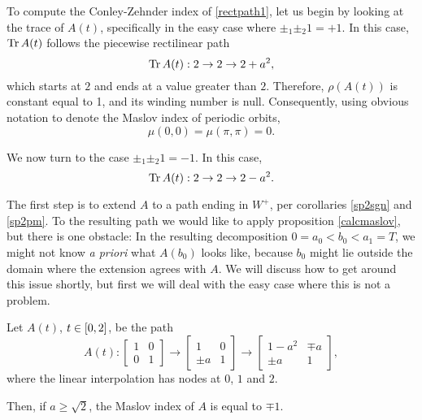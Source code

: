 To compute the Conley-Zehnder index of \eqref{rectpath1}, let us begin by looking at the trace of $A(t)$, specifically in the easy case where $\pm_1 \pm_2 1 = +1$. In this case, $\operatorname{Tr} A(t)$ follows the piecewise rectilinear path
\begin{equation}
\operatorname{Tr} A(t) : 2 \to 2 \to 2 + a^2,
\end{equation}
which starts at $2$ and ends at a value greater than $2$. Therefore, $\rho(A(t))$ is constant equal to 1, and its winding number is null. Consequently, using obvious notation to denote the Maslov index of periodic orbits,
\begin{equation}
\mu(0,0) = \mu(\pi,\pi) = 0.
\end{equation}

We now turn to the case $\pm_1 \pm_2 1 = -1$. In this case,
\begin{equation}
\operatorname{Tr} A(t) : 2 \to 2 \to 2 - a^2.
\end{equation}

The first step is to extend $A$ to a path ending in $W^+$, per corollaries \ref{sp2sgn} and \ref{sp2pm}. To the resulting path we would like to apply proposition \ref{calcmaslov}, but there is one obstacle: In the resulting decomposition $0 = a_0 < b_0 < a_1 = T$, we might not know \textit{a priori} what $A(b_0)$ looks like, because $b_0$ might lie outside the domain where the extension agrees with $A$. We will discuss how to get around this issue shortly, but first we will deal with the easy case where this is not a problem.

\begin{prop}\label{easymaslov}
Let $A(t)$, $t \in \interval02$, be the path
\begin{equation}
A(t):
\begin{bmatrix}
1 & 0\\
0 & 1
\end{bmatrix}
\to
\begin{bmatrix}
1 & 0\\
\pm a & 1
\end{bmatrix}
\to
\begin{bmatrix}
1 - a^2 &  \mp a\\
\pm a & 1
\end{bmatrix},
\end{equation}
where the linear interpolation has nodes at $0$, $1$ and $2$.

Then, if $a \geq \sqrt2$, the Maslov index of $A$ is equal to $\mp 1$.
\end{prop}

